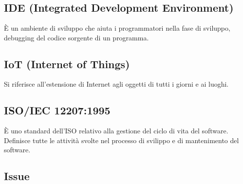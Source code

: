 \section{}
\subsection*{IDE (Integrated Development Environment)} È un ambiente di sviluppo che aiuta i programmatori nella fase di sviluppo, debugging del codice sorgente di un programma.

\subsection*{IoT (Internet of Things)} Si riferisce all'estensione di Internet agli oggetti di tutti i giorni e ai luoghi.

\subsection*{ISO/IEC 12207:1995} È uno standard dell'ISO relativo alla gestione del ciclo di vita del software. Definisce tutte le attività svolte nel processo di svilippo e di mantenimento del software.

\subsection*{Issue}
